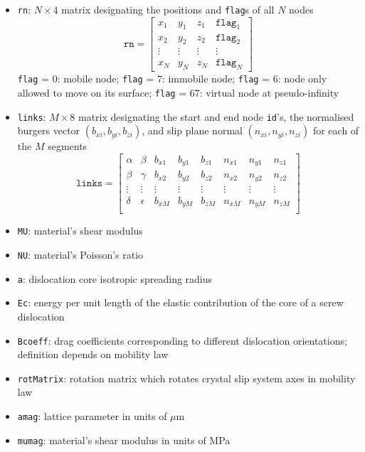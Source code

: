 \documentclass[a4paper,12pt]{article}
\begin{document}
\begin{itemize}
  \item \texttt{rn}: $N \times 4$ matrix designating the positions and \texttt{flag}s of all $N$ nodes
  \begin{equation*}
  \texttt{rn} = 
  \begin{bmatrix}
  x_1 & y_1 & z_1 & \texttt{flag}_1 \\
  x_2 & y_2 & z_2 & \texttt{flag}_2 \\
  \vdots & \vdots & \vdots & \vdots \\
  x_N & y_N & z_N & \texttt{flag}_N
  \end{bmatrix}
  \end{equation*}
  \texttt{flag} = 0: mobile node; \texttt{flag} = 7: immobile node; \texttt{flag} = 6: node only allowed to move on its surface; \texttt{flag} = 67: virtual node at pseudo-infinity
  \item \texttt{links}: $M \times 8$ matrix designating the start and end node \texttt{id}'s, the normalised burgers vector $(b_{xi},b_{yi},b_{zi})$, and slip plane normal $(n_{xi},n_{yi},n_{zi})$ for each of the $M$ segments
  \begin{equation*}
  \texttt{links} = 
  \begin{bmatrix}
  \alpha & \beta & b_{x1} & b_{y1} & b_{z1} & n_{x1} & n_{y1} & n_{z1}\\
  \beta & \gamma & b_{x2} & b_{y2} & b_{z2} & n_{x2} & n_{y2} & n_{z2}\\
  \vdots&\vdots&\vdots&\vdots&\vdots&\vdots&\vdots&\vdots\\
  \delta & \epsilon & b_{xM} & b_{yM} & b_{zM} & n_{xM} & n_{yM} & n_{zM}\\
  \end{bmatrix}
  \end{equation*}
  \item \texttt{MU}: material's shear modulus
  \item \texttt{NU}: material's Poisson's ratio
  \item \texttt{a}: dislocation core isotropic spreading radius
  \item \texttt{Ec}: energy per unit length of the elastic contribution of the core of a screw dislocation
  \item \texttt{Bcoeff}: drag coefficients corresponding to different dislocation orientations; definition depends on mobility law
  \item \texttt{rotMatrix}: rotation matrix which rotates crystal slip system axes in mobility law
  \item \texttt{amag}: lattice parameter in units of $\mu$m
  \item \texttt{mumag}: material's shear modulus in units of MPa
\end{itemize}
\end{document}
